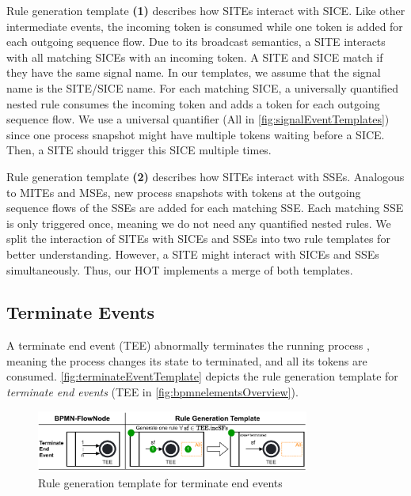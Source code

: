 \documentclass{lmcs} %
\begin{document}
Rule generation template \textbf{(1)} describes how SITEs interact with SICE.
Like other intermediate events, the incoming token is consumed while one token is added for each outgoing sequence flow.
Due to its broadcast semantics, a SITE interacts with all matching SICEs with an incoming token.
A SITE and SICE match if they have the same signal name.
In our templates, we assume that the signal name is the SITE/SICE name.
For each matching SICE, a universally quantified nested rule consumes the incoming token and adds a token for each outgoing sequence flow.
We use a universal quantifier (\textsf{All} in \autoref{fig:signalEventTemplates}) since one process snapshot might have multiple tokens waiting before a SICE.
Then, a SITE should trigger this SICE multiple times.

Rule generation template \textbf{(2)} describes how SITEs interact with SSEs.
Analogous to MITEs and MSEs, new process snapshots with tokens at the outgoing sequence flows of the SSEs are added for each matching SSE.
Each matching SSE is only triggered once, meaning we do not need any quantified nested rules.
We split the interaction of SITEs with SICEs and SSEs into two rule templates for better understanding.
However, a SITE might interact with SICEs and SSEs simultaneously.
Thus, our HOT implements a merge of both templates.

\subsection{Terminate Events}
A terminate end event (TEE) abnormally terminates the running process \cite{objectmanagementgroupBusinessProcessModel2013}, meaning the process changes its state to terminated, and all its tokens are consumed.
\autoref{fig:terminateEventTemplate} depicts the rule generation template for \textit{terminate end events} (\textsf{TEE} in \autoref{fig:bpmnelementsOverview}).

\begin{figure}[ht]
    \centering
    \includegraphics[width=0.8\textwidth]{images/terminate_end_event_template.pdf}
    \caption{Rule generation template for terminate end events}
    \label{fig:terminateEventTemplate}
\end{figure}
\end{document}
